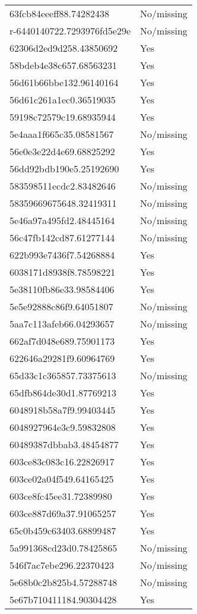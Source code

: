 \begin{tabular}{ll}
63fcb84eeeff88.74282438 & No/missing \\
r-6440140722.7293976fd5e29e & No/missing \\
62306d2ed9d258.43850692 & Yes \\
58bdeb4e38c657.68563231 & Yes \\
56d61b66bbe132.96140164 & Yes \\
56d61c261a1ec0.36519035 & Yes \\
59198c72579c19.68935944 & Yes \\
5e4aaa1f665c35.08581567 & No/missing \\
56e0e3e22d4e69.68825292 & Yes \\
56dd92bdb190e5.25192690 & Yes \\
583598511ecdc2.83482646 & No/missing \\
58359669675648.32419311 & No/missing \\
5e46a97a495fd2.48445164 & No/missing \\
56c47fb142cd87.61277144 & No/missing \\
622b993e7436f7.54268884 & Yes \\
6038171d8938f8.78598221 & Yes \\
5e38110fb86e33.98584406 & Yes \\
5e5e92888c86f9.64051807 & No/missing \\
5aa7c113afeb66.04293657 & No/missing \\
662af7d048e689.75901173 & Yes \\
622646a29281f9.60964769 & Yes \\
65d33c1c365857.73375613 & No/missing \\
65dfb864de30d1.87769213 & Yes \\
6048918b58a7f9.99403445 & Yes \\
6048927964e3c9.59832808 & Yes \\
60489387dbbab3.48454877 & Yes \\
603ce83c083c16.22826917 & Yes \\
603ce02a04f549.64165425 & Yes \\
603ce8fc45ee31.72389980 & Yes \\
603ce887d69a37.91065257 & Yes \\
65c0b459c63403.68899487 & Yes \\
5a991368cd23d0.78425865 & No/missing \\
546f7ac7ebe296.22370423 & No/missing \\
5e68b0c2b825b4.57288748 & No/missing \\
5e67b710411184.90304428 & Yes \\

\end{tabular}
